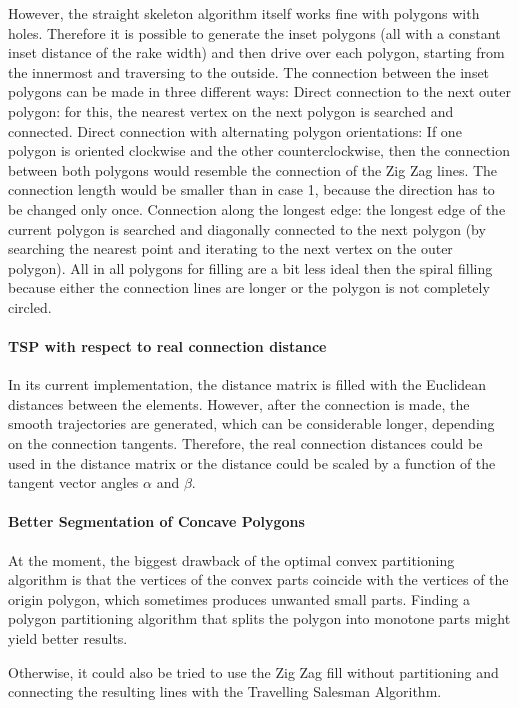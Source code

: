 However, the straight skeleton algorithm itself works fine with polygons with holes. Therefore it is possible to generate the inset polygons (all with a constant inset distance of the rake width) and then drive over each polygon, starting from the innermost and traversing to the outside.
The connection between the inset polygons can be made in three different ways:
Direct connection to the next outer polygon: for this, the nearest vertex on the next polygon is searched and connected.
Direct connection with alternating polygon orientations: If one polygon is oriented clockwise and the other counterclockwise, then the connection between both polygons would resemble the connection of the Zig Zag lines. The connection length would be smaller than in case 1, because the direction has to be changed only once.
Connection along the longest edge: the longest edge of the current polygon is searched and diagonally connected to the next polygon (by searching the nearest point and iterating to the next vertex on the outer polygon).
All in all polygons for filling are a bit less ideal then the spiral filling because either the connection lines are longer or the polygon is not completely circled.

\paragraph{TSP with respect to real connection distance}

In its current implementation, the distance matrix is filled with the Euclidean distances between the elements. However, after the connection is made, the smooth trajectories are generated, which can be considerable longer, depending on the connection tangents. Therefore, the real connection distances could be used in the distance matrix or the distance could be scaled by a function of the tangent vector angles $\alpha$ and $\beta$.

\paragraph{Better Segmentation of Concave Polygons}

At the moment, the biggest drawback of the optimal convex partitioning algorithm is that the vertices of the convex parts coincide with the vertices of the origin polygon, which sometimes produces unwanted small parts. Finding a polygon partitioning algorithm that splits the polygon into monotone parts might yield better results.

Otherwise, it could also be tried to use the Zig Zag fill without partitioning and connecting the resulting lines with the Travelling Salesman Algorithm.


